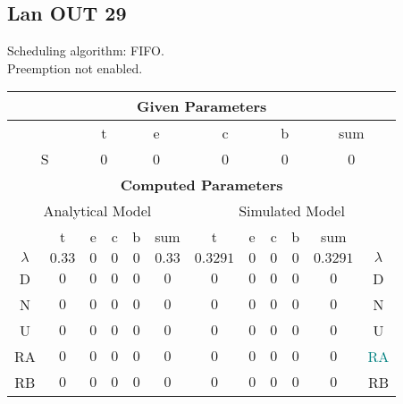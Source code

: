 \documentclass{article}
\begin{document}
\subsection{Lan OUT 29}
Scheduling algorithm: FIFO.\\Preemption not enabled. \\\begin{table}[H]\centering\begin{tabular}{@{}c|cccc|c||cccc|c|c@{}}\toprule\multicolumn{12}{c}{\textbf{Given Parameters}}\\\midrule\multicolumn{2}{c|}{ } & \multicolumn{2}{c}{t} & \multicolumn{2}{c}{e} & \multicolumn{2}{c}{c} & \multicolumn{2}{c}{b} & \multicolumn{2}{|c}{sum} \\ \midrule\multicolumn{2}{c|}{S} & \multicolumn{2}{c}{0} & \multicolumn{2}{c}{0} & \multicolumn{2}{c}{0} & \multicolumn{2}{c}{0} & \multicolumn{2}{|c}{0}\\ \midrule\midrule\multicolumn{12}{c}{\textbf{Computed Parameters}}\\ \midrule\multicolumn{6}{c||}{Analytical Model} & \multicolumn{6}{c}{Simulated Model}\\ 
 \midrule & t & e & c & b & sum & t & e & c & b & sum &  \\ \midrule$\lambda$ &$0.33$ & $0$ & $0$ & $0$ & $0.33$ & $0.3291$ & $0$ & $0$ & $0$ & $0.3291$& $\lambda$ \\D & $0$ & $0$ & $0$ & $0$ & $0$ & $0$ & $0$ & $0$ & $0$ & $0$& D\\N & $0$ & $0$ & $0$ & $0$ & $0$ & $0$ & $0$ & $0$ & $0$ & $0$& N\\U & $0$ & $0$ & $0$ & $0$ & $0$ & $0$ & $0$ & $0$ & $0$ & $0$& U\\RA & $0$ & $0$ & $0$ & $0$ & $0$ & $0$ & $0$ & $0$ & $0$ & $0$& \textcolor{teal}{RA}\\RB & $0$ & $0$ & $0$ & $0$ & $0$ & $0$ & $0$ & $0$ & $0$ & $0$& RB\\
\bottomrule
\end{tabular}
\end{table}
\filbreak
\end{document}
